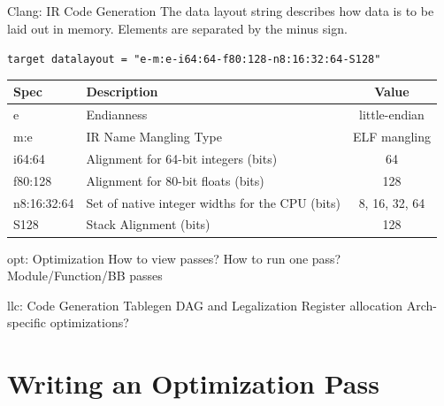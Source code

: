 \documentclass{beamer}
\begin{document}
\begin{frame}{Clang: IR Code Generation}
    The data layout string describes how data is to be laid out in memory. Elements are separated by the minus sign.

    \vspace{1em}
    \footnotesize
    \texttt{target datalayout = "e-m:e-i64:64-f80:128-n8:16:32:64-S128"}

    \vspace{1ex}
    \begin{tabular}{l | l c}
        \toprule
        Spec        & Description & Value \\
        \toprule
        e           & Endianness & little-endian \\
        m:e         & IR Name Mangling Type & ELF mangling \\
        i64:64      & Alignment for 64-bit integers (bits) & 64 \\
        f80:128     & Alignment for 80-bit floats (bits)    & 128 \\
        n8:16:32:64 & Set of native integer widths for the CPU (bits) & 8, 16, 32, 64 \\
        S128        & Stack Alignment (bits) & 128 \\
        \bottomrule
    \end{tabular}
\end{frame}


\begin{frame}{opt: Optimization}
How to view passes?
How to run one pass?
Module/Function/BB passes
\end{frame}


\begin{frame}{llc: Code Generation}
Tablegen
DAG and Legalization
Register allocation
Arch-specific optimizations?
\end{frame}


\section{Writing an Optimization Pass}
\end{document}
